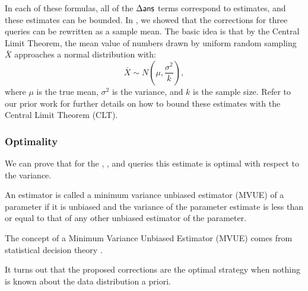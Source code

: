 In each of these formulas, all of the $\Delta\textsf{ans}$ terms correspond to estimates, and these estimates can be bounded.
In \cite{wang1999sample}, we showed that the corrections for three queries can be rewritten as a sample mean.
The basic idea is that by the Central Limit Theorem, the mean value of numbers drawn by uniform random sampling $\bar{X}$ approaches a normal distribution with:
\[
\bar{X} \sim N(\mu,\frac{\sigma^2}{k}),
\]
where $\mu$ is the true mean, $\sigma^2$ is the variance, and $k$ is the sample size.
Refer to our prior work \cite{wang1999sample} for further details on how to bound these estimates with the Central Limit Theorem (CLT).

\iffalse
By the Central Limit Theorem, the mean value of numbers drawn by uniform random sampling $\bar{X}$ approaches a normal distribution with:
\[
\bar{X} \sim N(\mu,\frac{\sigma^2}{k}),
\]
where $\mu$ is the true mean, $\sigma^2$ is the variance, and $k$ is the sample size.\footnote{\scriptsize For sampling without replacement, there is an additional term of $\sqrt{\frac{N-k}{N-1}}$. We consider estimates where N is large in comparison to k making this term insignificant.}
We can use this to bound the term with its 95\% confidence interval (or any other user specified probability), e.g., $\bar{X} \pm 1.96 \frac{\sigma}{\sqrt{k}}$; refer to our prior work \cite{wang1999sample} for further details.

In the statistical literature, the class of aggregate functions for which we can apply this technique is formalized as the class of U-statistics, see \cite{hoeffding1948class}.
\fi

\subsubsection{Optimality}
We can prove that for the \sumfunc, \countfunc, and \avgfunc queries this estimate is optimal with respect to the variance.
\begin{proposition}
An estimator is called a minimum variance unbiased estimator (MVUE) of a parameter if it is unbiased and the variance of the parameter estimate is less than or equal to that of any other unbiased estimator of the parameter.
\end{proposition}
The concept of a Minimum Variance Unbiased Estimator (MVUE) comes from statistical decision theory \cite{cox1979theoretical}.
\iffalse
Unbiased estimators are ones that, in expectation, are correct.
However, on its own, the concept of an unbiased estimate is not useful as we can construct bad unbiased estimates.
For example, if we simply pick a random element from a set, it is still an unbiased estimate of the mean of the set.
The variance of the estimate determines the size of our confidence intervals thus is important to consider.
\fi
It turns out that the proposed corrections are the optimal strategy when nothing is known about the data distribution a priori.

